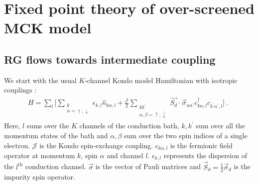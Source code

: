 \documentclass[reprint,prb,superscriptaddress]{revtex4-2}
\begin{document}
\section{Fixed point theory of over-screened MCK model}

\subsection{RG flows towards intermediate coupling}
\label{rg_flow_section}
We start with the usual \(K\)-channel Kondo model Hamiltonian with isotropic couplings \cite{Noz_blandin_1980}:
\begin{gather}
	\label{mc_ham}
	H = \sum_l\bigg[\sum_{\substack{k\\\alpha=\uparrow,\downarrow}}\epsilon_{k,l} \hat n_{k\alpha,l} + \frac{\mathcal{J}}{2}\sum_{\substack{kk^\prime\\\alpha,\beta= \uparrow,\downarrow}} \vec{S_d}\cdot\vec{\sigma}_{\alpha\alpha^\prime}c_{k\alpha,l}^\dagger c_{k^\prime\alpha^\prime, l}\bigg]~.~~
\end{gather}
Here, \(l\) sums over the \(K\) channels of the conduction bath, \(k,k^\prime\) sum over all the momentum states of the bath and \(\alpha,\beta\) sum over the two spin indices of a single electron. \(\mathcal{J}\) is the Kondo spin-exchange coupling. \(c_{k\alpha,l}\) is the fermionic field operator at momentum \(k\), spin \(\alpha\) and channel \(l\). \(\epsilon_{k,l}\) represents the dispersion of the \(l^\text{th}\) conduction channel. \(\vec \sigma\) is the vector of Pauli matrices and \(\vec S_d = \frac{1}{2}\vec \sigma_d\) is the impurity spin operator.
\end{document}
